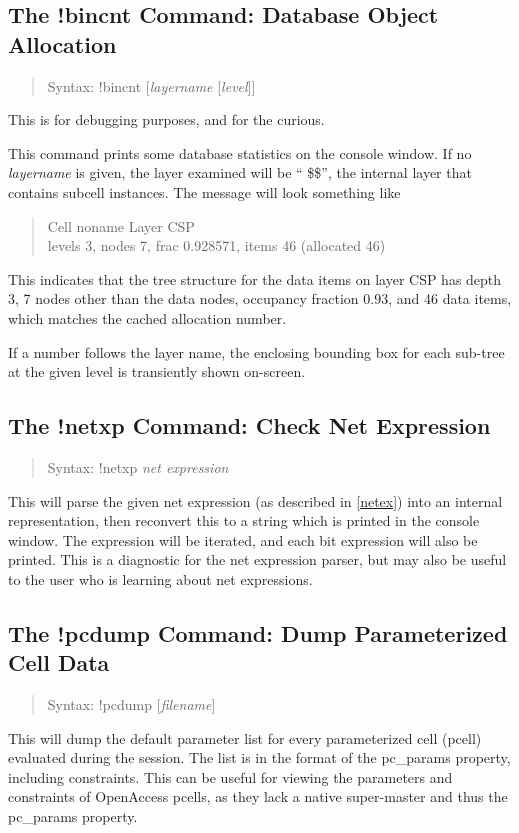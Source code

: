 \subsection{The {\cb !bincnt} Command: Database Object Allocation}
\begin{quote}
Syntax: {\vt !bincnt} [{\it layername} [{\it level\/}]]
\end{quote}
This is for debugging purposes, and for the curious.

This command prints some database statistics on the console window. 
If no {\it layername} is given, the layer examined will be ``{\vt
\$\$}'', the internal layer that contains subcell instances.  The
message will look something like
\begin{quote} \vt
Cell noname Layer CSP\\
levels 3, nodes 7, frac 0.928571, items 46 (allocated 46)
\end{quote}

This indicates that the tree structure for the data items on layer CSP
has depth 3, 7 nodes other than the data nodes, occupancy fraction
0.93, and 46 data items, which matches the cached allocation number.

If a number follows the layer name, the enclosing bounding box for
each sub-tree at the given level is transiently shown on-screen.


\subsection{The {\cb !netxp} Command: Check Net Expression}
\begin{quote}
Syntax: {\vt !netxp} {\it net expression}
\end{quote}
This will parse the given net expression (as described in \ref{netex})
into an internal representation, then reconvert this to a string which
is printed in the console window.  The expression will be iterated,
and each bit expression will also be printed.  This is a diagnostic
for the net expression parser, but may also be useful to the user who
is learning about net expressions.


\subsection{The {\cb !pcdump} Command: Dump Parameterized Cell Data}
\begin{quote}
Syntax: {\vt !pcdump} [{\it filename}]
\end{quote}
This will dump the default parameter list for every parameterized cell
(pcell) evaluated during the session.  The list is in the format of
the {\et pc\_params} property, including constraints.
\ifoa
This can be
useful for viewing the parameters and constraints of OpenAccess
pcells, as they lack a native super-master and thus the {\et
pc\_params} property.
\fi

